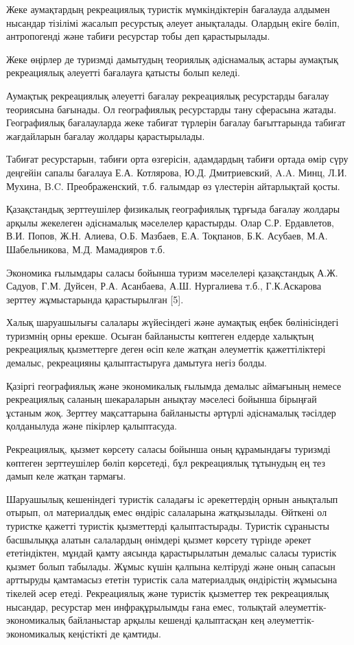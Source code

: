 \begin{multicols}{2}
Жеке аумақтардың рекреациялық туристік мүмкіндіктерін бағалауда алдымен
нысандар тізілімі жасалып ресурстық әлеует анықталады. Олардың екіге
бөліп, антропогенді және табиғи ресурстар тобы деп қарастырылады.

Жеке өңірлер де туризмді дамытудың теориялық әдіснамалық астары аумақтық
рекреациялық әлеуетті бағалауға қатысты болып келеді.

Аумақтық рекреациялық әлеуетті бағалау рекреациялық ресурстарды бағалау
теориясына бағынады. Ол географиялық ресурстарды тану сферасына жатады.
Географиялық бағалауларда жеке табиғат түрлерін бағалау бағыттарында
табиғат жағдайларын бағалау жолдары қарастырылады.

Табиғат ресурстарын, табиғи орта өзгерісін, адамдардың табиғи ортада
өмір сүру деңгейін сапалы бағалауа Е.А. Котлярова, Ю.Д. Дмитриевский,
A.A. Минц, Л.И. Мухина, B.C. Преображенский, т.б. ғалымдар өз үлестерін
айтарлықтай қосты.

Қазақстандық зерттеушілер физикалық географиялық тұрғыда бағалау жолдары
арқылы жекелеген әдіснамалық мәселелер қарастырды. Олар С.Р. Ердавлетов,
В.И. Попов, Ж.Н. Алиева, О.Б. Мазбаев, Е.А. Тоқпанов, Б.К. Асубаев, М.А.
Шабельникова, М.Д. Мамадияров т.б.

Экономика ғылымдары саласы бойынша туризм мәселелері қазақстандық А.Ж.
Садуов, Г.М. Дуйсен, Р.А. Асанбаева, А.Ш. Нургалиева т.б., Г.К.Аскарова
зерттеу жұмыстарында қарастырылған {[}5{]}.

Халық шаруашылығы салалары жүйесіндегі және аумақтық еңбек бөлінісіндегі
туризмнің орны ерекше. Осыған байланысты көптеген елдерде халықтың
рекреациялық қызметтерге деген өсіп келе жатқан әлеуметтік
қажеттіліктері демалыс, рекреацияны қалыптастыруға дамытуға негіз болды.

Қазіргі географиялық және экономикалық ғылымда демалыс аймағының немесе
рекреациялық саланың шекараларын анықтау мәселесі бойынша бірыңғай
ұстаным жоқ. Зерттеу мақсаттарына байланысты әртүрлі әдіснамалық
тәсілдер қолданылуда және пікірлер қалыптасуда.

Рекреациялық, қызмет көрсету саласы бойынша оның құрамындағы туризмді
көптеген зерттеушілер бөліп көрсетеді, бұл рекреациялық тұтынудың ең тез
дамып келе жатқан тармағы.

Шаруашылық кешеніндегі туристік саладағы іс әрекеттердің орнын анықталып
отырып, ол материалдық емес өндіріс салаларына жатқызылады. Өйткені ол
туристке қажетті туристік қызметтерді қалыптастырады. Туристік сұранысты
басшылыққа алатын салалардың өнімдері қызмет көрсету түрінде әрекет
ететіндіктен, мұндай қамту аясында қарастырылатын демалыс саласы
туристік қызмет болып табылады. Жұмыс күшін қалпына келтіруді және оның
сапасын арттыруды қамтамасыз ететін туристік сала материалдық өндірістің
жұмысына тікелей әсер етеді. Рекреациялық және туристік қызметтер тек
рекреациялық нысандар, ресурстар мен инфрақұрылымды ғана емес, толықтай
әлеуметтік-экономикалық байланыстар арқылы кешенді қалыптасқан кең
әлеуметтік-экономикалық кеңістікті де қамтиды.


\end{multicols}
